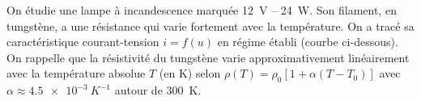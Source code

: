 \documentclass[11pt]{article}
\begin{document}
\begin{exercice}
On étudie une lampe à incandescence marquée \SI{12}{V} -- \SI{24}{W}. Son filament, en tungstène, a une résistance qui varie fortement avec la température. On a tracé sa caractéristique courant-tension $i = f(u)$ en régime établi (courbe ci-dessous). On rappelle que la résistivité du tungstène varie approximativement linéairement avec la température absolue $T$ (en K) selon $\rho(T) = \rho_0[1 + \alpha(T - T_0)]$ avec $\alpha \approx \SI{4,5e-3}{K^{-1}}$ autour de \SI{300}{K}.

\begin{center}
\end{center}


\end{exercice}
\end{document}
